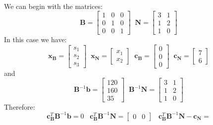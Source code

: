 \begin{example}
\begin{displaymath}
\begin{aligned}
\end{aligned}
\end{displaymath}
We can begin with the matrices:
\begin{displaymath}
\mathbf{B} = \begin{bmatrix}
1 & 0 & 0\\
0 & 1 & 0\\
0 & 0 & 1
\end{bmatrix}\;\;
\mathbf{N} = \begin{bmatrix}
3 & 1\\
1 & 2\\
1 & 0
\end{bmatrix}
\end{displaymath}
In this case we have:
\begin{displaymath}
\mathbf{x_B} = \begin{bmatrix}s_1\\s_2\\s_3\end{bmatrix}\;\;
\mathbf{x_N} = \begin{bmatrix}x_1\\x_2\end{bmatrix}\;\;
\mathbf{c_B} = \begin{bmatrix}0\\0\\0\end{bmatrix}\;\;
\mathbf{c_N} = \begin{bmatrix}7\\6\end{bmatrix}
\end{displaymath}
and 
\begin{displaymath}
\mathbf{B}^{-1}\mathbf{b} = \begin{bmatrix}120\\160\\35\end{bmatrix}\;\;
\mathbf{B}^{-1}\mathbf{N} = \begin{bmatrix}
3 & 1\\
1 & 2\\
1 & 0
\end{bmatrix}
\end{displaymath}
Therefore:
\begin{displaymath}
\mathbf{c}_\mathbf{B}^T\mathbf{B}^{-1}\mathbf{b} = 0 \;\;\;
\mathbf{c}_\mathbf{B}^T\mathbf{B}^{-1}\mathbf{N} = \begin{bmatrix}0 & 0\end{bmatrix}\;\;\;
\mathbf{c}_\mathbf{B}^T\mathbf{B}^{-1}\mathbf{N} - \mathbf{c_N} = 

\end{displaymath}
\end{example}
